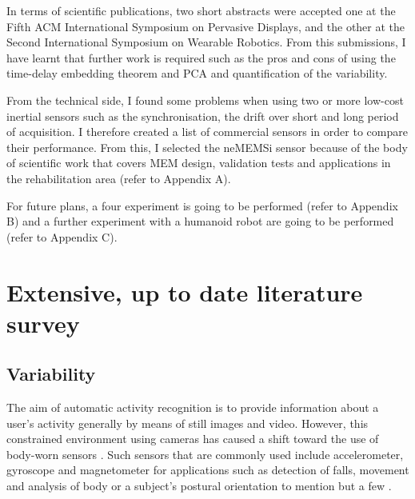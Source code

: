 \documentclass[9pt,journal,onecolumn,compsoc]{IEEEtran}
\begin{document}
In terms of scientific publications, two short abstracts were accepted one at
the Fifth ACM International Symposium on Pervasive Displays, and 
the other at the Second International Symposium on Wearable Robotics.
From this submissions, I have learnt that further work is 
required such as the pros and cons of using the time-delay embedding theorem and PCA
and quantification of the variability.

From the technical side, I found some problems when using two or more 
low-cost inertial sensors such as the synchronisation, the drift over short and long period of acquisition.
I therefore created a list of commercial sensors in order to compare their performance.
From this, I selected the neMEMSi sensor because of the body of scientific work that covers
MEM design, validation tests and applications in the rehabilitation area (refer to Appendix A).


For future plans, a four experiment is going to be performed (refer to Appendix B)
and a further experiment with a humanoid robot are going to be performed (refer to Appendix C).


\appendices

\section{Extensive, up to date literature survey}

\subsection{Variability}

The aim of automatic activity recognition is to provide information about a user's activity
generally by means of still images and video. 
However, this constrained environment using cameras has caused a shift toward the use of body-worn sensors \cite{bulling2014}.
Such sensors that are commonly used include accelerometer, gyroscope and magnetometer
for applications such as detection of falls, movement and analysis of body 
or a subject's postural orientation to mention but a few \cite{Mukhopadhyay2014}.
\end{document}
